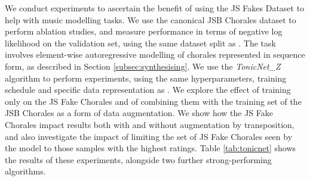 \documentclass{article}
\begin{document}
We conduct experiments to ascertain the benefit of using the JS Fakes Dataset to help with music modelling tasks. We use the canonical JSB Chorales dataset to perform ablation studies, and measure performance in terms of negative log likelihood on the validation set, using the same dataset split as \cite{boulanger}. The task involves element-wise autoregressive modelling of chorales represented in sequence form, as described in Section \ref{subsec:synthesising}. We use the \textit{TonicNet\_Z} algorithm to perform experiments, using the same hyperparameters, training schedule and specific data representation as \cite{tonicnet}. We explore the effect of training only on the JS Fake Chorales and of combining them with the training set of the JSB Chorales as a form of data augmentation. We show how the JS Fake Chorales impact results both with and without augmentation by transposition, and also investigate the impact of limiting the set of JS Fake Chorales seen by the model to those samples with the highest  ratings. Table \ref{tab:tonicnet} shows the results of these experiments, alongside two further strong-performing algorithms.
\end{document}
